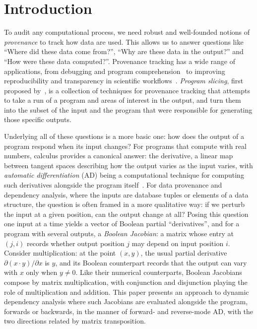 \section{Introduction}
\label{sec:introduction}

To audit any computational process, we need robust and well-founded notions of \emph{provenance} to track how
data are used. This allows us to answer questions like ``Where did these data come from?'', ``Why are these
data in the output?'' and ``How were these data computed?''. Provenance tracking has a wide range of
applications, from debugging and program comprehension~\cite{buneman95,cheney07} to improving reproducibility
and transparency in scientific workflows~\cite{kontogiannis08}. \emph{Program slicing}, first proposed
by~\citet{weiser81}, is a collection of techniques for provenance tracking that attempts to take a run of a
program and areas of interest in the output, and turn them into the subset of the input and the program that
were responsible for generating those specific outputs.

Underlying all of these questions is a more basic one: how does the output of a program respond when
its input changes? For programs that compute with real numbers, calculus provides a canonical answer: the
derivative, a linear map between tangent spaces describing how the output varies as the input varies, with
\emph{automatic differentiation} (AD) being a computational technique for computing such derivatives alongside
the program itself~\cite{siskind08,elliott18,vakar22}. For data provenance and dependency analysis, where the
inputs are database tuples or elements of a data structure, the question is often framed in a more qualitative
way: if we perturb the input at a given position, can the output change at all? Posing this question one input
at a time yields a vector of Boolean partial ``derivatives'', and for a program with several outputs, a
\emph{Boolean Jacobian}: a matrix whose entry at $(j, i)$ records whether output position $j$ may depend on
input position $i$. Consider multiplication: at the point $(x, y)$, the usual partial derivative $\partial(x
\cdot y)/\partial x$ is $y$, and its Boolean counterpart records that the output can vary with $x$ only when
$y \neq 0$. Like their numerical counterparts, Boolean Jacobians compose by matrix multiplication, with
conjunction and disjunction playing the role of multiplication and addition. This paper presents an approach
to dynamic dependency analysis where such Jacobians are evaluated alongside the program, forwards or
backwards, in the manner of forward- and reverse-mode AD, with the two directions related by matrix
transposition.

